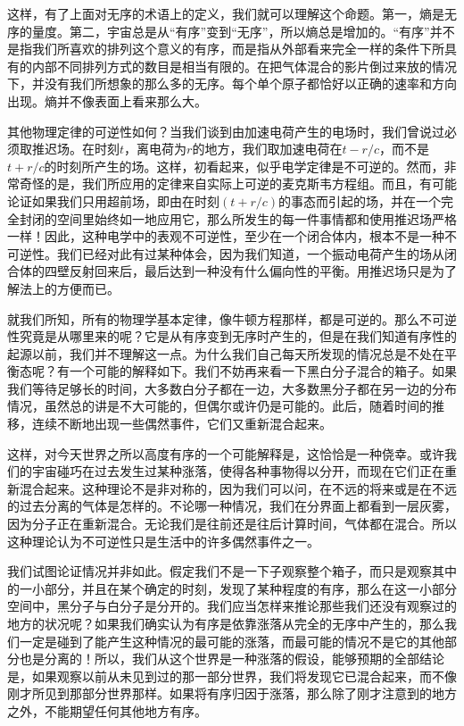 这样，有了上面对无序的术语上的定义，我们就可以理解这个命题。第一，熵是无序的量度。第二，宇宙总是从“有序”变到“无序”，所以熵总是增加的。“有序”并不是指我们所喜欢的排列这个意义的有序，而是指从外部看来完全一样的条件下所具有的内部不同排列方式的数目是相当有限的。在把气体混合的影片倒过来放的情况下，并没有我们所想象的那么多的无序。每个单个原子都恰好以正确的速率和方向出现。熵并不像表面上看来那么大。

其他物理定律的可逆性如何？当我们谈到由加速电荷产生的电场时，我们曾说过必须取推迟场。在时刻$t$，离电荷为$r$的地方，我们取加速电荷在$t-r/c$，而不是$t+r/c$的时刻所产生的场。这样，初看起来，似乎电学定律是不可逆的。然而，非常奇怪的是，我们所应用的定律来自实际上可逆的麦克斯韦方程组。而且，有可能论证如果我们只用超前场，即由在时刻$(t+r/c)$的事态而引起的场，并在一个完全封闭的空间里始终如一地应用它，那么所发生的每一件事情都和使用推迟场严格一样！因此，这种电学中的表观不可逆性，至少在一个闭合体内，根本不是一种不可逆性。我们已经对此有过某种体会，因为我们知道，一个振动电荷产生的场从闭合体的四壁反射回来后，最后达到一种没有什么偏向性的平衡。用推迟场只是为了解法上的方便而已。

就我们所知，所有的物理学基本定律，像牛顿方程那样，都是可逆的。那么不可逆性究竟是从哪里来的呢？它是从有序变到无序时产生的，但是在我们知道有序性的起源以前，我们并不理解这一点。为什么我们自己每天所发现的情况总是不处在平衡态呢？有一个可能的解释如下。我们不妨再来看一下黑白分子混合的箱子。如果我们等待足够长的时间，大多数白分子都在一边，大多数黑分子都在另一边的分布情况，虽然总的讲是不大可能的，但偶尔或许仍是可能的。此后，随着时间的推移，连续不断地出现一些偶然事件，它们又重新混合起来。

这样，对今天世界之所以高度有序的一个可能解释是，这恰恰是一种侥幸。或许我们的宇宙碰巧在过去发生过某种涨落，使得各种事物得以分开，而现在它们正在重新混合起来。这种理论不是非对称的，因为我们可以问，在不远的将来或是在不远的过去分离的气体是怎样的。不论哪一种情况，我们在分界面上都看到一层灰雾，因为分子正在重新混合。无论我们是往前还是往后计算时间，气体都在混合。所以这种理论认为不可逆性只是生活中的许多偶然事件之一。

我们试图论证情况并非如此。假定我们不是一下子观察整个箱子，而只是观察其中的一小部分，并且在某个确定的时刻，发现了某种程度的有序，那么在这一小部分空间中，黑分子与白分子是分开的。我们应当怎样来推论那些我们还没有观察过的地方的状况呢？如果我们确实认为有序是依靠涨落从完全的无序中产生的，那么我们一定是碰到了能产生这种情况的最可能的涨落，而最可能的情况不是它的其他部分也是分离的！所以，我们从这个世界是一种涨落的假设，能够预期的全部结论是，如果观察以前从未见到过的那一部分世界，我们将发现它已混合起来，而不像刚才所见到那部分世界那样。如果将有序归因于涨落，那么除了刚才注意到的地方之外，不能期望任何其他地方有序。

